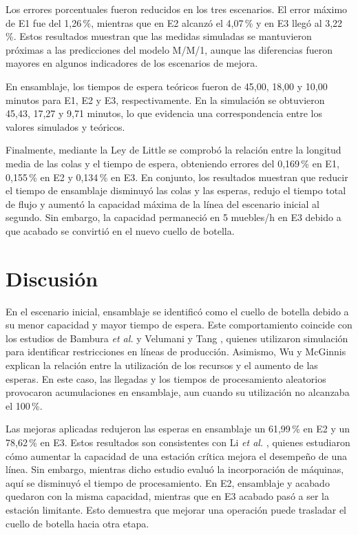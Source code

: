 \documentclass[conference,a4paper]{IEEEtran}
\begin{document}
Los errores porcentuales fueron reducidos en los tres escenarios. El error máximo de E1 fue
del 1,26\,\%, mientras que en E2 alcanzó el 4,07\,\% y en E3 llegó al 3,22\,\%. Estos
resultados muestran que las medidas simuladas se mantuvieron próximas a las predicciones del
modelo M/M/1, aunque las diferencias fueron mayores en algunos indicadores de los escenarios
de mejora.

En ensamblaje, los tiempos de espera teóricos fueron de 45,00, 18,00 y 10,00 minutos para
E1, E2 y E3, respectivamente. En la simulación se obtuvieron 45,43, 17,27 y 9,71 minutos, lo
que evidencia una correspondencia entre los valores simulados y teóricos.

Finalmente, mediante la Ley de Little se comprobó la relación entre la longitud media de las
colas y el tiempo de espera, obteniendo errores del 0,169\,\% en E1, 0,155\,\% en E2 y
0,134\,\% en E3. En conjunto, los resultados muestran que reducir el tiempo de ensamblaje
disminuyó las colas y las esperas, redujo el tiempo total de flujo y aumentó la capacidad
máxima de la línea del escenario inicial al segundo. Sin embargo, la capacidad permaneció en 5
muebles/h en E3 debido a que acabado se convirtió en el nuevo cuello de botella.

\section{Discusión}
En el escenario inicial, ensamblaje se identificó como el cuello de botella debido a su menor
capacidad y mayor tiempo de espera. Este comportamiento coincide con los estudios de Bambura
\textit{et al.} \cite{bambura2020} y Velumani y Tang \cite{velumani2017}, quienes utilizaron
simulación para identificar restricciones en líneas de producción. Asimismo, Wu y McGinnis
\cite{wu2012} explican la relación entre la utilización de los recursos y el aumento de las
esperas. En este caso, las llegadas y los tiempos de procesamiento aleatorios provocaron
acumulaciones en ensamblaje, aun cuando su utilización no alcanzaba el 100\,\%.

Las mejoras aplicadas redujeron las esperas en ensamblaje un 61,99\,\% en E2 y un 78,62\,\%
en E3. Estos resultados son consistentes con Li \textit{et al.} \cite{li2020}, quienes
estudiaron cómo aumentar la capacidad de una estación crítica mejora el desempeño de una
línea. Sin embargo, mientras dicho estudio evaluó la incorporación de máquinas, aquí se
disminuyó el tiempo de procesamiento. En E2, ensamblaje y acabado quedaron con la misma
capacidad, mientras que en E3 acabado pasó a ser la estación limitante. Esto demuestra que
mejorar una operación puede trasladar el cuello de botella hacia otra etapa.
\end{document}
